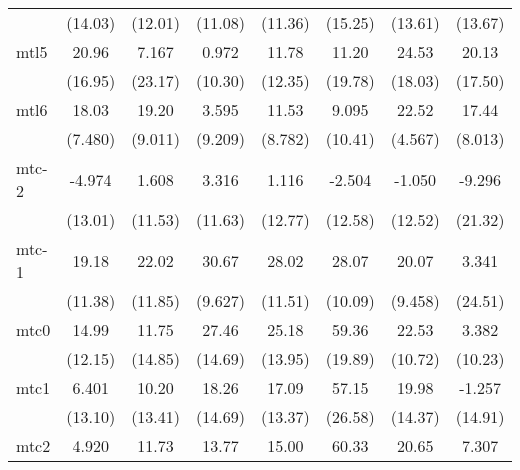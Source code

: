 \documentclass{article}
\begin{document}
{\begin{longtable}{l*{7}{c}}
                &  (14.03)         &  (12.01)         &  (11.08)         &  (11.36)         &  (15.25)         &  (13.61)         &  (13.67)         \\
mtl5            &    20.96         &    7.167         &    0.972         &    11.78         &    11.20         &    24.53         &    20.13         \\
                &  (16.95)         &  (23.17)         &  (10.30)         &  (12.35)         &  (19.78)         &  (18.03)         &  (17.50)         \\
mtl6            &    18.03         &    19.20         &    3.595         &    11.53         &    9.095         &    22.52\sym{**} &    17.44         \\
                &  (7.480)         &  (9.011)         &  (9.209)         &  (8.782)         &  (10.41)         &  (4.567)         &  (8.013)         \\
mtc-2           &   -4.974         &    1.608         &    3.316         &    1.116         &   -2.504         &   -1.050         &   -9.296         \\
                &  (13.01)         &  (11.53)         &  (11.63)         &  (12.77)         &  (12.58)         &  (12.52)         &  (21.32)         \\
mtc-1           &    19.18         &    22.02         &    30.67\sym{*}  &    28.02         &    28.07\sym{*}  &    20.07         &    3.341         \\
                &  (11.38)         &  (11.85)         &  (9.627)         &  (11.51)         &  (10.09)         &  (9.458)         &  (24.51)         \\
mtc0            &    14.99         &    11.75         &    27.46         &    25.18         &    59.36\sym{*}  &    22.53         &    3.382         \\
                &  (12.15)         &  (14.85)         &  (14.69)         &  (13.95)         &  (19.89)         &  (10.72)         &  (10.23)         \\
mtc1            &    6.401         &    10.20         &    18.26         &    17.09         &    57.15         &    19.98         &   -1.257         \\
                &  (13.10)         &  (13.41)         &  (14.69)         &  (13.37)         &  (26.58)         &  (14.37)         &  (14.91)         \\
mtc2            &    4.920         &    11.73         &    13.77         &    15.00         &    60.33         &    20.65         &    7.307         \\

\end{longtable}}
\end{document}
